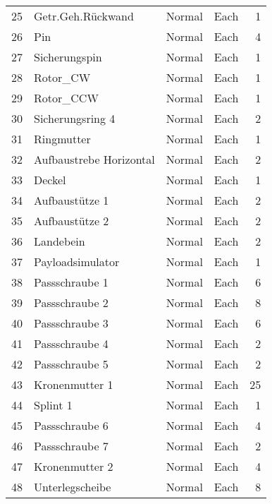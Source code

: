 \documentclass[11pt, a4paper]{scrartcl}
\begin{document}
\begin{table}[htbp]
\begin{tabular}{|l|l|l|l|r|}
      25    & Getr.Geh.Rückwand & Normal & Each  & 1 \\
      26    & Pin   & Normal & Each  & 4 \\
      27    & Sicherungspin & Normal & Each  & 1 \\
      28    & Rotor\_CW & Normal & Each  & 1 \\
      29    & Rotor\_CCW & Normal & Each  & 1 \\
      30    & Sicherungsring 4 & Normal & Each  & 2 \\
      31    & Ringmutter & Normal & Each  & 1 \\
      32    & Aufbaustrebe Horizontal & Normal & Each  & 2 \\
      33    & Deckel & Normal & Each  & 1 \\
      34    & Aufbaustütze 1 & Normal & Each  & 2 \\
      35    & Aufbaustütze 2 & Normal & Each  & 2 \\
      36    & Landebein & Normal & Each  & 2 \\
      37    & Payloadsimulator & Normal & Each  & 1 \\
      38    & Passschraube 1 & Normal & Each  & 6 \\
      39    & Passschraube 2 & Normal & Each  & 8 \\
      40    & Passschraube 3 & Normal & Each  & 6 \\
      41    & Passschraube 4 & Normal & Each  & 2 \\
      42    & Passschraube 5 & Normal & Each  & 2 \\
      43    & Kronenmutter 1 & Normal & Each  & 25 \\
      44    & Splint 1 & Normal & Each  & 1 \\
      45    & Passschraube 6 & Normal & Each  & 4 \\
      46    & Passschraube 7 & Normal & Each  & 2 \\
      47    & Kronenmutter 2 & Normal & Each  & 4 \\
      48    & Unterlegscheibe & Normal & Each  & 8 \\ 
      \end{tabular}
    \label{tab:addlabel}
\end{table}
  
\end{document}
